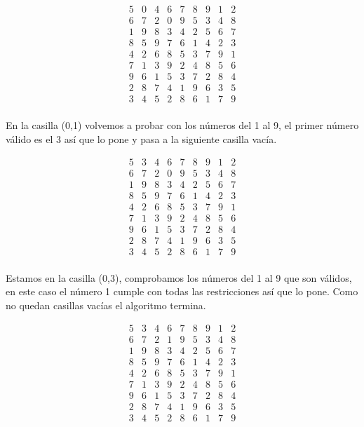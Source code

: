 \documentclass[11pt, a4paper]{article}
\theoremstyle{theorem-style}
\theoremstyle{definition-style}
\theoremstyle{remark-style}
\theoremstyle{example-style}
\begin{document}
\[
\begin{array}{ccccccccc}
5 & 0 & 4 & 6 & 7 & 8 & 9 & 1 & 2\\
6 & 7 & 2 & 0 & 9 & 5 & 3 & 4 & 8\\
1 & 9 & 8 & 3 & 4 & 2 & 5 & 6 & 7\\
8 & 5 & 9 & 7 & 6 & 1 & 4 & 2 & 3\\
4 & 2 & 6 & 8 & 5 & 3 & 7 & 9 & 1\\
7 & 1 & 3 & 9 & 2 & 4 & 8 & 5 & 6\\
9 & 6 & 1 & 5 & 3 & 7 & 2 & 8 & 4\\
2 & 8 & 7 & 4 & 1 & 9 & 6 & 3 & 5\\
3 & 4 & 5 & 2 & 8 & 6 & 1 & 7 & 9\\
\end{array}
\]
 
En la casilla (0,1) volvemos a probar con los números del 1 al 9, el primer número válido es el 3 así que lo pone y pasa a la siguiente casilla vacía.

\[
\begin{array}{ccccccccc}
5 & 3 & 4 & 6 & 7 & 8 & 9 & 1 & 2\\
6 & 7 & 2 & 0 & 9 & 5 & 3 & 4 & 8\\
1 & 9 & 8 & 3 & 4 & 2 & 5 & 6 & 7\\
8 & 5 & 9 & 7 & 6 & 1 & 4 & 2 & 3\\
4 & 2 & 6 & 8 & 5 & 3 & 7 & 9 & 1\\
7 & 1 & 3 & 9 & 2 & 4 & 8 & 5 & 6\\
9 & 6 & 1 & 5 & 3 & 7 & 2 & 8 & 4\\
2 & 8 & 7 & 4 & 1 & 9 & 6 & 3 & 5\\
3 & 4 & 5 & 2 & 8 & 6 & 1 & 7 & 9\\
\end{array}
\]

Estamos en la casilla (0,3), comprobamos los números del 1 al 9 que son válidos, en este caso el número 1 cumple con todas las restricciones así que lo pone. Como no quedan casillas vacías el algoritmo termina.

\[
\begin{array}{ccccccccc}
5 & 3 & 4 & 6 & 7 & 8 & 9 & 1 & 2\\
6 & 7 & 2 & 1 & 9 & 5 & 3 & 4 & 8\\
1 & 9 & 8 & 3 & 4 & 2 & 5 & 6 & 7\\
8 & 5 & 9 & 7 & 6 & 1 & 4 & 2 & 3\\
4 & 2 & 6 & 8 & 5 & 3 & 7 & 9 & 1\\
7 & 1 & 3 & 9 & 2 & 4 & 8 & 5 & 6\\
9 & 6 & 1 & 5 & 3 & 7 & 2 & 8 & 4\\
2 & 8 & 7 & 4 & 1 & 9 & 6 & 3 & 5\\
3 & 4 & 5 & 2 & 8 & 6 & 1 & 7 & 9\\
\end{array}
\]
\end{document}
